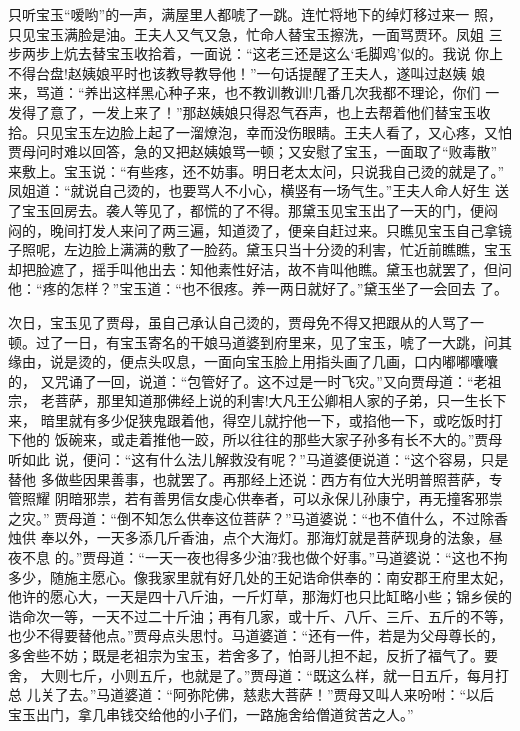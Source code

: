 只听宝玉“嗳哟”的一声，满屋里人都唬了一跳。连忙将地下的绰灯移过来一
照，只见宝玉满脸是油。王夫人又气又急，忙命人替宝玉擦洗，一面骂贾环。凤姐
三步两步上炕去替宝玉收拾着，一面说：“这老三还是这么‘毛脚鸡’似的。我说
你上不得台盘!赵姨娘平时也该教导教导他！”一句话提醒了王夫人，遂叫过赵姨
娘来，骂道：“养出这样黑心种子来，也不教训教训!几番几次我都不理论，你们
一发得了意了，一发上来了！”那赵姨娘只得忍气吞声，也上去帮着他们替宝玉收
拾。只见宝玉左边脸上起了一溜燎泡，幸而没伤眼睛。王夫人看了，又心疼，又怕
贾母问时难以回答，急的又把赵姨娘骂一顿；又安慰了宝玉，一面取了“败毒散”
来敷上。宝玉说：“有些疼，还不妨事。明日老太太问，只说我自己烫的就是了。”
凤姐道：“就说自己烫的，也要骂人不小心，横竖有一场气生。”王夫人命人好生
送了宝玉回房去。袭人等见了，都慌的了不得。那黛玉见宝玉出了一天的门，便闷
闷的，晚间打发人来问了两三遍，知道烫了，便亲自赶过来。只瞧见宝玉自己拿镜
子照呢，左边脸上满满的敷了一脸药。黛玉只当十分烫的利害，忙近前瞧瞧，宝玉
却把脸遮了，摇手叫他出去：知他素性好洁，故不肯叫他瞧。黛玉也就罢了，但问
他：“疼的怎样？”宝玉道：“也不很疼。养一两日就好了。”黛玉坐了一会回去
了。

次日，宝玉见了贾母，虽自己承认自己烫的，贾母免不得又把跟从的人骂了一
顿。过了一日，有宝玉寄名的干娘马道婆到府里来，见了宝玉，唬了一大跳，问其
缘由，说是烫的，便点头叹息，一面向宝玉脸上用指头画了几画，口内嘟嘟囔囔的，
又咒诵了一回，说道：“包管好了。这不过是一时飞灾。”又向贾母道：“老祖宗，
老菩萨，那里知道那佛经上说的利害!大凡王公卿相人家的子弟，只一生长下来，
暗里就有多少促狭鬼跟着他，得空儿就拧他一下，或掐他一下，或吃饭时打下他的
饭碗来，或走着推他一跤，所以往往的那些大家子孙多有长不大的。”贾母听如此
说，便问：“这有什么法儿解救没有呢？”马道婆便说道：“这个容易，只是替他
多做些因果善事，也就罢了。再那经上还说：西方有位大光明普照菩萨，专管照耀
阴暗邪祟，若有善男信女虔心供奉者，可以永保儿孙康宁，再无撞客邪祟之灾。”
贾母道：“倒不知怎么供奉这位菩萨？”马道婆说：“也不值什么，不过除香烛供
奉以外，一天多添几斤香油，点个大海灯。那海灯就是菩萨现身的法象，昼夜不息
的。”贾母道：“一天一夜也得多少油?我也做个好事。”马道婆说：“这也不拘
多少，随施主愿心。像我家里就有好几处的王妃诰命供奉的：南安郡王府里太妃，
他许的愿心大，一天是四十八斤油，一斤灯草，那海灯也只比缸略小些；锦乡侯的
诰命次一等，一天不过二十斤油；再有几家，或十斤、八斤、三斤、五斤的不等，
也少不得要替他点。”贾母点头思忖。马道婆道：“还有一件，若是为父母尊长的，
多舍些不妨；既是老祖宗为宝玉，若舍多了，怕哥儿担不起，反折了福气了。要舍，
大则七斤，小则五斤，也就是了。”贾母道：“既这么样，就一日五斤，每月打总
儿关了去。”马道婆道：“阿弥陀佛，慈悲大菩萨！”贾母又叫人来吩咐：“以后
宝玉出门，拿几串钱交给他的小子们，一路施舍给僧道贫苦之人。”

